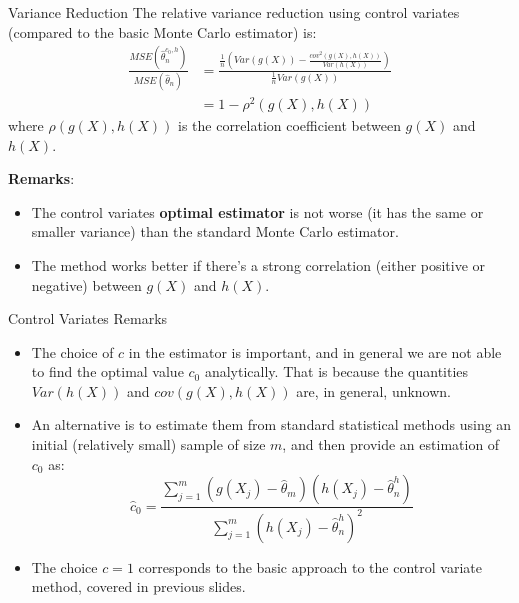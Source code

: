 \documentclass[8pt]{beamer}
\begin{document}
\begin{frame}{Variance Reduction}
The relative variance reduction using control variates (compared to the basic Monte Carlo estimator) is:
\begin{align*}
  \frac{MSE(\hat{\theta}_n^{c_0,h})}{MSE(\hat{\theta}_n)} &= \frac{\frac{1}{n}(Var(g(X))-\frac{cov^2(g(X),h(X))}{Var(h(X))})}{\frac{1}{n}Var(g(X))}\\
  														  &= 1-\rho^2(g(X),h(X))
\end{align*}
where $\rho(g(X),h(X))$ is the correlation coefficient between $g(X)$ and $h(X)$.

\vspace{2mm}

\textbf{Remarks}:
\begin{itemize}
	\item The control variates \textbf{optimal estimator} is not worse (it has the same or smaller variance) than the standard Monte Carlo estimator.
	\item The method works better if there's a strong correlation (either positive or negative) between $g(X)$ and $h(X)$.
\end{itemize}
\end{frame}

\begin{frame}{Control Variates Remarks}
\begin{itemize}
	\item The choice of $c$ in the estimator is important, and in general we are not able to find the optimal value $c_0$ analytically. That is  because the quantities $Var(h(X))$ and $cov(g(X),h(X))$ are, in general, unknown. 
	\item An alternative is  to estimate them from standard statistical methods using an initial (relatively small) sample of size $m$, and then provide an estimation of $c_0$ as:
\begin{equation*}
    \hat{c}_0=\frac{\sum_{j=1}^m (g(X_j)-\hat{\theta}_m)(h(X_j)-\hat{\theta}^{h}_n)}{\sum_{j=1}^m (h(X_j)-\hat{\theta}^{h}_n)^2}
\end{equation*}
	\item The choice $c=1$ corresponds to the basic approach to the control variate method, covered in previous slides.
\end{itemize}
\end{frame}
\end{document}
